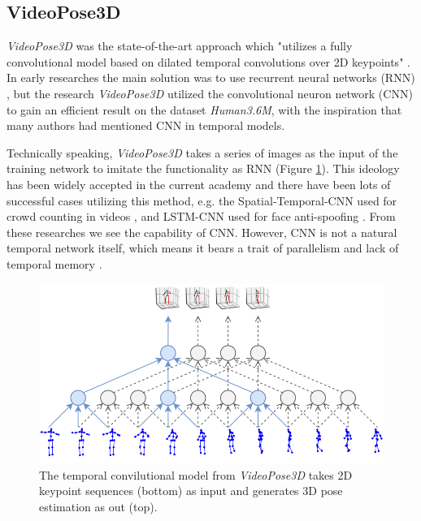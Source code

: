 \documentclass[10pt,twocolumn,letterpaper]{article}
\begin{document}
\subsection{VideoPose3D}

\textit{VideoPose3D} was the state-of-the-art approach which "utilizes a fully convolutional model based on dilated 
temporal convolutions over 2D keypoints" \cite{pavllo20193d}. In early researches the main solution was to use recurrent 
neural networks (RNN) \cite{lee2018propagating}, but the research \textit{VideoPose3D} utilized the convolutional 
neuron network (CNN) to gain an efficient result on the dataset \textit{Human3.6M}, with the inspiration that
many authors had mentioned CNN in temporal models.

Technically speaking, \textit{VideoPose3D} takes a series of images as the input of the training network to imitate the
functionality as RNN (Figure \ref{CNN_in_VideoPose3D}). This ideology has been widely accepted in the current academy and there have been lots of successful
cases utilizing this method, e.g. the Spatial-Temporal-CNN used for crowd counting in videos \cite{miao2019st}, and LSTM-CNN
used for face anti-spoofing \cite{xu2015learning}. From these researches we see the capability of CNN. However, CNN is not a natural temporal
network itself, which means it bears a trait of parallelism and lack of temporal memory \cite{shin2016deep}.

\begin{figure}[H]
	\begin{center}
  		\includegraphics[width=1.0\linewidth]{CNN_in_VideoPose3D.png}
	\end{center}
   	\caption{The temporal convilutional model from \textit{VideoPose3D} takes 2D keypoint sequences (bottom) as input and 
   			 generates 3D pose estimation as out (top).}
	\label{CNN_in_VideoPose3D}
\end{figure}
\end{document}
